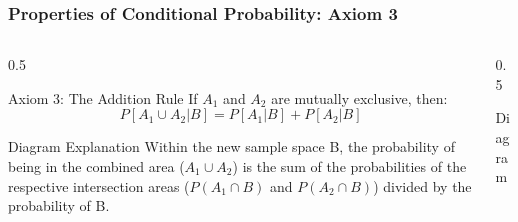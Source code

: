 \begin{frame}
    \frametitle{Properties of Conditional Probability: Axiom 3}
    
    \begin{columns}[T]
        \begin{column}{0.5\textwidth}
            \begin{block}{Axiom 3: The Addition Rule}
                If \(A_1\) and \(A_2\) are mutually exclusive, then:
                \[ P[A_1 \cup A_2 | B] = P[A_1|B] + P[A_2|B] \]
            \end{block}
            
            \begin{block}{Diagram Explanation}
                Within the new sample space B, the probability of being in the combined area (\(A_1 \cup A_2\)) is the sum of the probabilities of the respective intersection areas (\(P(A_1 \cap B)\) and \(P(A_2 \cap B)\)) divided by the probability of B.
            \end{block}
        \end{column}
        
        \begin{column}{0.5\textwidth}
            \begin{block}{Diagram}
                \centering
            \end{block}
        \end{column}
    \end{columns}
\end{frame}

